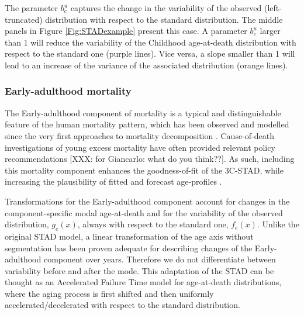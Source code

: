 \documentclass[11pt, a4paper]{article}
\begin{document}
The parameter $b_{c}^{u}$ captures the change in the variability of the observed (left-truncated) distribution with respect to the standard distribution. The middle panels in Figure \ref{Fig:STADexample} present this case. A parameter $b_{c}^{u}$ larger than 1 will reduce the variability of the Childhood age-at-death distribution with respect to the standard one (purple lines). Vice versa, a slope smaller than 1 will lead to an increase of the variance of the associated distribution (orange lines). 

\subsubsection{Early-adulthood mortality}

{\color{red} The Early-adulthood component of mortality is a typical and distinguishable feature of the human mortality pattern, which has been observed and modelled since the very first approaches to mortality decomposition \cite[e.g.~][]{thiele1871mathematical,lexis1878duree,pearson1897chances}. Cause-of-death investigations of young excess mortality have often provided relevant policy recommendations \citep{heuveline2002international,remund2018young} [XXX: for Giancarlo: what do you think??]. As such, including this mortality component enhances the goodness-of-fit of the 3C-STAD, while increasing the plausibility of fitted and forecast age-profiles .}

Transformations for the Early-adulthood component account for changes in the component-specific modal age-at-death and for the variability of the observed distribution, $g_{e}(x)$, always with respect to the standard one, $f_{e}(x)$. Unlike the original STAD model, a linear transformation of the age axis without segmentation has been proven adequate for describing changes of the Early-adulthood component over years. Therefore we do not differentiate between variability before and after the mode. This adaptation of the STAD can be thought as an Accelerated Failure Time model for age-at-death distributions, where the aging process is first shifted and then uniformly accelerated/decelerated with respect to the standard distribution. 
\end{document}
